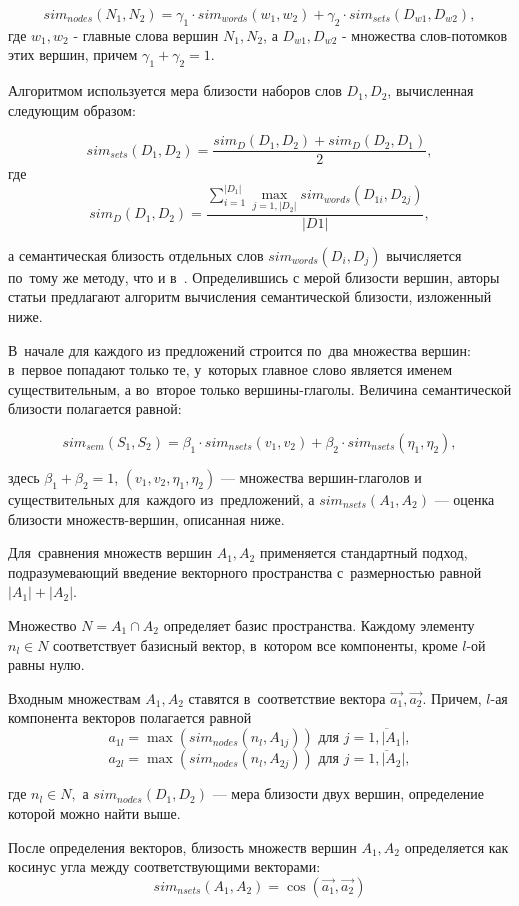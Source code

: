 $$ sim_{nodes}(N_1, N_2) = \gamma_1 \cdot sim_{words}(w_1,w_2) + \gamma_2 \cdot sim_{sets}(D_{w1}, D_{w2}), $$
где $w_1, w_2$ - главные слова вершин $N_1, N_2$, а $D_{w1}, D_{w2}$ - множества слов-потомков этих вершин,
причем $\gamma_1+\gamma_2=1$.

Алгоритмом используется мера близости наборов слов $D_1,D_2$, вычисленная следующим образом:

$$sim_{sets}(D_1, D_2) = \frac{sim_{D}(D_1,D_2) + sim_{D}(D_2, D_1)}{2}, $$
где 
$$sim_{D}(D_1, D_2) = \frac{ \sum \limits_{i=1}^{|D_1|} \max_{j=1,|D_2|} sim_{words}(D_{1i}, D_{2j}) } { |D1| },$$

а семантическая близость отдельных слов $sim_{words}(D_i, D_j)$ вычисляется по~тому же методу, что и в~\cite{wordnetSim}.
Определившись с мерой близости вершин, авторы статьи предлагают 
алгоритм вычисления семантической близости, изложенный ниже.

В~начале для каждого из предложений строится по~два множества вершин:
в~первое попадают только те, у~которых главное слово является именем существительным,
а во~второе только вершины-глаголы.
Величина семантической близости полагается равной:

$$sim_{sem}(S_1 , S_2) = \beta_1 \cdot sim_{nsets}(v_1, v_2) + \beta_2 \cdot sim_{nsets}(\eta_1, \eta_2), $$

здесь 
$\beta_1 + \beta_2 = 1$, 
$(v_1, v_2, \eta_1, \eta_2)$ --- множества  вершин-глаголов и существительных для~каждого из~предложений,
а $sim_{nsets}(A_1,A_2)$ --- оценка близости множеств-вершин, описанная ниже.

Для~сравнения множеств вершин $A_1,A_2$ применяется стандартный подход,
подразумевающий введение векторного пространства с~размерностью равной $|A_1|+|A_2|$.

Множество $ N = A_1 \cap A_2 $ определяет базис пространства.
Каждому элементу $n_l \in N $ соответствует базисный вектор, в~котором
все компоненты, кроме $l$-ой равны нулю.

Входным множествам $A_1,A_2$ ставятся в~соответствие вектора $\vec{a_1},\vec{a_2}$.
Причем, $l$-ая компонента векторов полагается равной 
$$a_{1l} = \max(sim_{nodes}(n_l, A_{1j})) \text{ для } j=\overline{1,|A_1|},$$
$$a_{2l} = \max(sim_{nodes}(n_l, A_{2j})) \text{ для } j=\overline{1,|A_2|},$$

где $n_l \in N, $
а $sim_{nodes}(D_1,D_2)$ --- мера близости двух вершин, определение которой можно найти выше.

После определения векторов, близость множеств вершин $A_1,A_2$ определяется как 
косинус угла между соответствующими векторами:
$$ sim_{nsets}(A_1,A_2) = \cos\left(\vec{a_1},\vec{a_2}\right) $$

